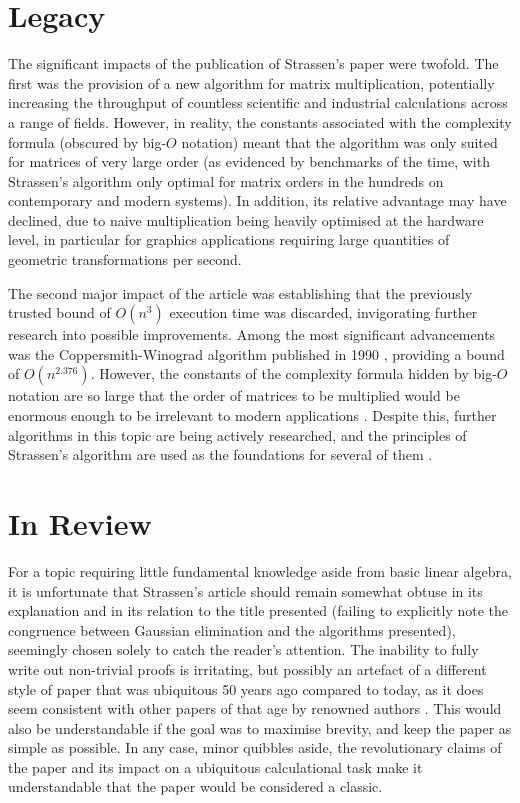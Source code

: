\documentclass[11pt]{article}
\begin{document}
\section{Legacy}

The significant impacts of the publication of Strassen's paper were twofold. 
The first was the provision of a new algorithm for matrix multiplication, 
potentially increasing the throughput of countless scientific and industrial 
calculations across a range of fields. However, in reality, the constants 
associated with the complexity formula (obscured by big-$O$ notation) meant 
that the algorithm was only suited for matrices of very large order (as 
evidenced by benchmarks of the time, with Strassen's algorithm only optimal for 
matrix orders in the hundreds on contemporary \cite{brent1970algorithms} and 
modern \cite{juby2012r} systems). In addition, its relative advantage may 
have declined, due to naive multiplication being heavily optimised at the 
hardware level, in particular for graphics applications requiring large 
quantities of geometric transformations per second. \par
The second major impact of the article was establishing that the previously 
trusted bound of $O(n^3)$ execution time was discarded, invigorating further 
research into possible improvements. Among the most significant advancements 
was the Coppersmith-Winograd algorithm published in 1990 
\cite{coppersmith1990matrix}, providing a bound of $O(n^{2.376})$. However, the 
constants of the complexity formula hidden by big-$O$ notation are so large 
that the order of matrices to be multiplied would be enormous enough to be 
irrelevant to modern applications \cite{robinson2005toward}. Despite this, 
further algorithms in this topic are being actively researched, and the 
principles of Strassen's algorithm are used as the foundations for several 
of them \cite{robinson2005toward}. \par


\section{In Review}

For a topic requiring little fundamental knowledge aside from basic linear 
algebra, it is unfortunate that Strassen's article should remain somewhat 
obtuse in its explanation and in its relation to the title presented (failing 
to explicitly note the congruence between Gaussian elimination and the 
algorithms presented), seemingly chosen solely to catch the reader's attention. 
The inability to fully write out non-trivial proofs is irritating, but possibly 
an artefact of a different style of paper that was ubiquitous 50 years ago 
compared to today, as it does seem consistent with other papers of that age by 
renowned authors \cite{knuth1965translation}. This would also be understandable 
if the goal was to maximise brevity, and keep the paper as simple as possible. 
In any case, minor quibbles aside, the revolutionary claims of the paper and 
its impact on a ubiquitous calculational task make it understandable that the 
paper would be considered a classic. \par



\end{document}
